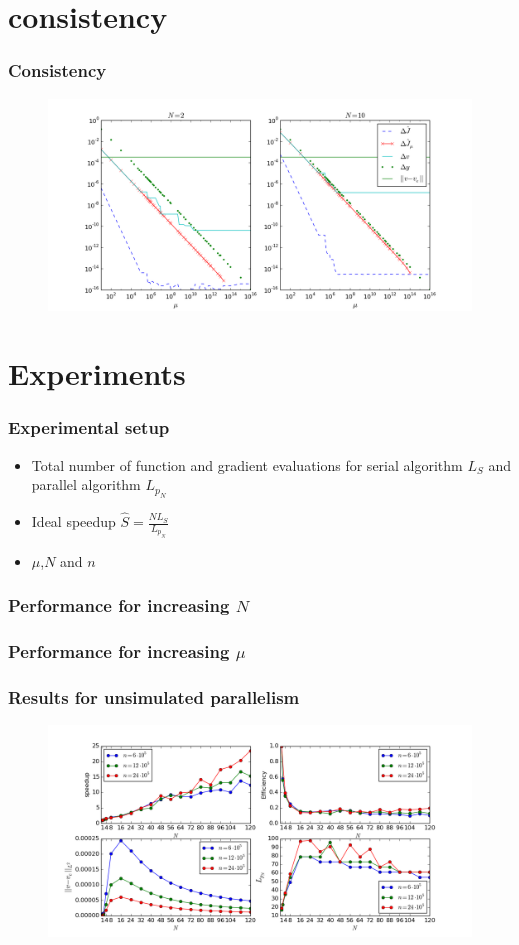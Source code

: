 \documentclass[9pt]{beamer}
\begin{document}
\section{consistency}
\begin{frame}
\frametitle{Consistency}
\begin{figure}[!h]
\centering
\includegraphics[scale=0.4]{consistency1.png}

\end{figure}
\end{frame}
\section{Experiments}
\begin{frame}
\frametitle{Experimental setup}
\begin{itemize}
\item<1->{Total number of function and gradient evaluations for serial algorithm $L_S$ and parallel algorithm $L_{p_N}$}
\item<1->{Ideal speedup $\hat{S}=\frac{N L_S}{L_{p_N}}$}
\item<2->{$\mu$,$N$ and $n$}
\end{itemize}
\end{frame}
\begin{frame}
\frametitle{Performance for increasing $N$}

\end{frame}
\begin{frame}
\frametitle{Performance for increasing $\mu$}
\end{frame}
\begin{frame}
\frametitle{Results for unsimulated parallelism}
\begin{figure}[!h]
\centering
\includegraphics[scale=0.2]{fspeed_fig.png}

\end{figure}
\end{frame}
\end{document}
